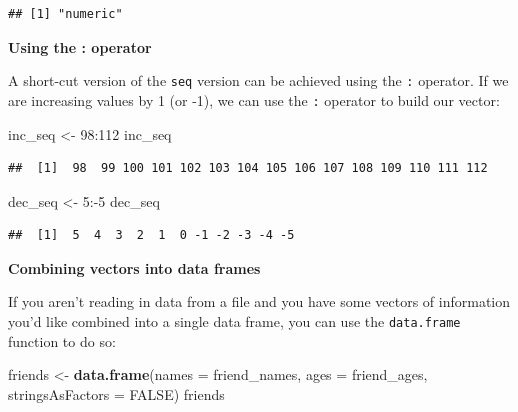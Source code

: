 \documentclass[]{tufte-book}
\newenvironment{Shaded}{\begin{snugshade}}{\end{snugshade}}
\newcommand{\KeywordTok}[1]{\textcolor[rgb]{0.13,0.29,0.53}{\textbf{{#1}}}}
\newcommand{\DataTypeTok}[1]{\textcolor[rgb]{0.13,0.29,0.53}{{#1}}}
\newcommand{\DecValTok}[1]{\textcolor[rgb]{0.00,0.00,0.81}{{#1}}}
\newcommand{\StringTok}[1]{\textcolor[rgb]{0.31,0.60,0.02}{{#1}}}
\newcommand{\OtherTok}[1]{\textcolor[rgb]{0.56,0.35,0.01}{{#1}}}
\newcommand{\NormalTok}[1]{{#1}}
\begin{document}
\begin{verbatim}
## [1] "numeric"
\end{verbatim}

\vspace*{0.2in}

\noindent\textbf{Using the : operator}\vspace*{0.1in}

A short-cut version of the \texttt{seq} version can be achieved using
the \texttt{:} operator. If we are increasing values by 1 (or -1), we
can use the \texttt{:} operator to build our vector:

\begin{Shaded}
\begin{Highlighting}[]
\NormalTok{inc_seq <-}\StringTok{ }\DecValTok{98}\NormalTok{:}\DecValTok{112}
\NormalTok{inc_seq}
\end{Highlighting}
\end{Shaded}

\begin{verbatim}
##  [1]  98  99 100 101 102 103 104 105 106 107 108 109 110 111 112
\end{verbatim}

\begin{Shaded}
\begin{Highlighting}[]
\NormalTok{dec_seq <-}\StringTok{ }\DecValTok{5}\NormalTok{:-}\DecValTok{5}
\NormalTok{dec_seq}
\end{Highlighting}
\end{Shaded}

\begin{verbatim}
##  [1]  5  4  3  2  1  0 -1 -2 -3 -4 -5
\end{verbatim}

\vspace*{0.2in}

\noindent\textbf{Combining vectors into data frames}\vspace*{0.1in}

If you aren't reading in data from a file and you have some vectors of
information you'd like combined into a single data frame, you can use
the \texttt{data.frame} function to do so:

\begin{Shaded}
\begin{Highlighting}[]
\NormalTok{friends <-}\StringTok{ }\KeywordTok{data.frame}\NormalTok{(}\DataTypeTok{names =} \NormalTok{friend_names, }
                      \DataTypeTok{ages =} \NormalTok{friend_ages,}
                      \DataTypeTok{stringsAsFactors =} \OtherTok{FALSE}\NormalTok{)}
\NormalTok{friends}
\end{Highlighting}
\end{Shaded}
\end{document}
